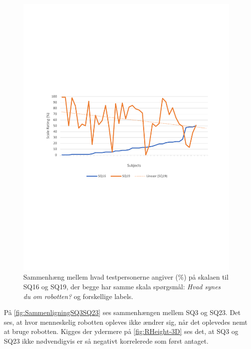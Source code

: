 \begin{figure}[H]
	\centering
	\includegraphics[width=\textwidth]{Figure/Korrelationsgrafer/SQ16+SQ19}
	\caption{Sammenhæng mellem hvad testpersonerne angiver (\%) på skalaen til SQ16 og SQ19, der begge har samme skala spørgsmål: \textit{Hvad synes du om robotten?} og forskellige labels.}
	\label{fig:SammenligningSQ16SQ19}
\end{figure}
\noindent
%
På \autoref{fig:SammenligningSQ3SQ23} ses sammenhængen mellem SQ3 og SQ23. Det ses, at hvor menneskelig robotten opleves ikke ændrer sig, når det oplevedes nemt at bruge robotten. Kigges der ydermere på \autoref{fig:RHeight-3D} ses det, at SQ3 og SQ23 ikke nødvendigvis er så negativt korrelerede som først antaget.
%
